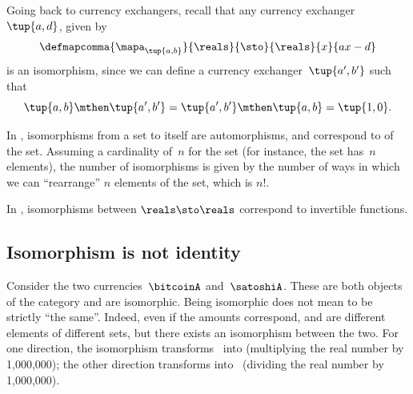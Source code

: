 {\begin{example}
    Going back to currency exchangers, recall that any currency exchanger~$\tup{a,d}$, given by
    \begin{equation}
        \defmapcomma{
            \mapa_{\tup{a,b}}
        }{
            \reals
        }{
            \sto
        }{
            \reals
        }{
            x
        }{
            ax-d
        }
    \end{equation}
    is an isomorphism, since we can define a currency exchanger~$\tup{a',b'}$ such that
    \begin{equation}
        \tup{a,b}\mthen \tup{a',b'}=\tup{a',b'}\mthen \tup{a,b}=\tup{1,0}.
    \end{equation}
\end{example}

\begin{example}
    In \FinSet, isomorphisms from a set to itself are automorphisms, and correspond to  of the set.
    Assuming a cardinality of~$n$ for the set (for instance, the set has~$n$ elements), the number of isomorphisms is given by the number of ways in which we can ``rearrange'' $n$ elements of the set, which is $n!
    $.
\end{example}

\begin{example}
    In \Set, isomorphisms between $\reals\sto \reals$ correspond to invertible functions.
\end{example}

\subsection{Isomorphism is not identity}
\begin{example}
    Consider the two currencies~$\bitcoinA$ and~$\satoshiA$.
    These are both objects of the category \Curr and are isomorphic.
    Being isomorphic does not mean to be strictly ``the same''.
    Indeed, even if the amounts correspond, \unit[1]{\bitcoinA} and \unit[1,000,000]{\satoshiA} are different elements of different sets, but there exists an isomorphism between the two.
    For one direction, the isomorphism transforms \bitcoinA \ into \satoshiA (multiplying the real number by 1,000,000);
    the other direction transforms \satoshiA into \bitcoinA \ (dividing the real number by 1,000,000).
\end{example}

}
